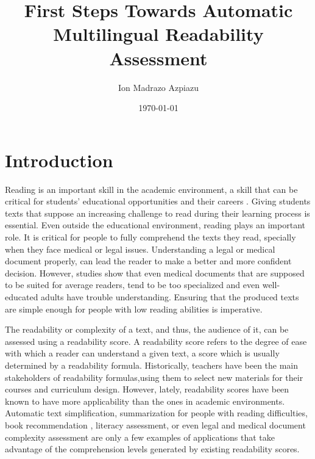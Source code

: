 \documentclass[12pt]{article}
\title{First Steps Towards Automatic Multilingual Readability Assessment}
\author{Ion Madrazo Azpiazu}
\date{\today}
\begin{document}
\maketitle
\section{Introduction}

Reading is an important skill in the academic environment, a skill that can be critical for students' educational opportunities and their careers \cite{robinson2000issues}. Giving students texts that suppose an increasing challenge to read during their learning process is essential. Even outside the educational environment, reading plays an important role. It is critical for people to fully comprehend the texts they read, specially when they face medical or legal issues. Understanding a legal or medical document properly, can lead the reader to make a better and more confident decision. However, studies\cite{medicalReadability1,medicalReadability2,medicalReadability3}  show that even medical documents that are supposed to be suited for average readers, tend to be too specialized and even well-educated adults have trouble understanding. Ensuring that the produced texts are simple enough for people with low reading abilities is imperative.



The readability or complexity of a text, and thus, the audience of it, can be assessed using a readability score. A readability score refers to the degree of ease with which a reader can understand a given text, a score which is usually determined by a readability formula. Historically, teachers have been the main stakeholders of readability formulas,using them to select new materials for their courses and curriculum design. However, lately, readability scores have been known to have more applicability than the ones in academic environments. Automatic text simplification\cite{textsimplification1,textsimplification2}, summarization for people with reading difficulties\cite{textsimplificationWithDisabilities1}, book recommendation \cite{pera2014automating}, literacy assessment\cite{literacy1}, or even legal\cite{legalreadability} and medical document complexity assessment\cite{medicalReadability1,medicalReadability2,medicalReadability3}  are only a few examples of applications that take advantage of the comprehension levels generated by existing readability scores.
\end{document}
